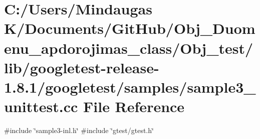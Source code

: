 \hypertarget{_obj__test_2lib_2googletest-release-1_88_81_2googletest_2samples_2sample3__unittest_8cc}{}\section{C\+:/\+Users/\+Mindaugas K/\+Documents/\+Git\+Hub/\+Obj\+\_\+\+Duomenu\+\_\+apdorojimas\+\_\+class/\+Obj\+\_\+test/lib/googletest-\/release-\/1.8.1/googletest/samples/sample3\+\_\+unittest.cc File Reference}
\label{_obj__test_2lib_2googletest-release-1_88_81_2googletest_2samples_2sample3__unittest_8cc}
{\ttfamily \#include \char`\"{}sample3-\/inl.\+h\char`\"{}}\newline
{\ttfamily \#include \char`\"{}gtest/gtest.\+h\char`\"{}}\newline
